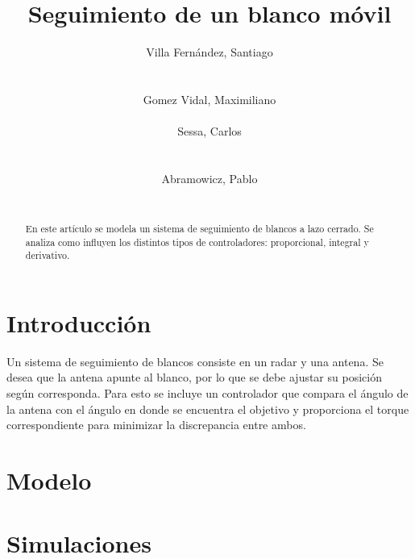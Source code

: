 \documentclass{sig-alternate}
\begin{document}
\title{Seguimiento de un blanco m\'{o}vil}


\author{
    \alignauthor
    Villa Fern\'{a}ndez, Santiago\\
     \\
    \ \\
    Gomez Vidal, Maximiliano\\
     \\
    \alignauthor
    Sessa, Carlos\\
     \\
    \ \\
    Abramowicz, Pablo\\
     \\
}

\maketitle

\begin{abstract}
En este art\'{i}culo se modela un sistema de seguimiento de blancos a lazo 
cerrado. Se analiza como influyen los distintos tipos de controladores: 
proporcional, integral y derivativo.
\end{abstract}


\section{Introducci\'{o}n}\label{introduccion}
Un sistema de seguimiento de blancos consiste en un radar y una antena.
Se desea que la antena apunte al blanco, por lo que se debe ajustar su 
posici\'{o}n  seg\'{u}n corresponda. Para esto se incluye un controlador que 
compara el \'{a}ngulo de la antena con el \'{a}ngulo en donde se encuentra el 
objetivo y proporciona el torque correspondiente para minimizar la discrepancia 
entre ambos.

\section{Modelo}\label{modelo}

\section{Simulaciones}\label{simulaciones}
\end{document}
